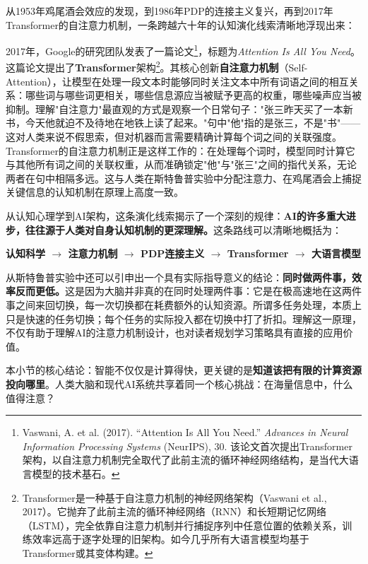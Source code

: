 从1953年鸡尾酒会效应的发现，到1986年PDP的连接主义复兴，再到2017年Transformer的自注意力机制，一条跨越六十年的认知演化线索清晰地浮现出来：

2017年，Google的研究团队发表了一篇论文\footnote{Vaswani, A. et al. (2017). ``Attention Is All You Need.'' \emph{Advances in Neural Information Processing Systems} (NeurIPS), 30. 该论文首次提出Transformer架构，以自注意力机制完全取代了此前主流的循环神经网络结构，是当代大语言模型的技术基石。}，标题为\emph{Attention Is All You Need}。这篇论文提出了\textbf{Transformer}架构\footnote{Transformer是一种基于自注意力机制的神经网络架构（Vaswani et al., 2017）。它抛弃了此前主流的循环神经网络（RNN）和长短期记忆网络（LSTM），完全依靠自注意力机制并行捕捉序列中任意位置的依赖关系，训练效率远高于逐字处理的旧架构。如今几乎所有大语言模型均基于Transformer或其变体构建。}。其核心创新\textbf{自注意力机制}（Self-Attention），让模型在处理一段文本时能够同时关注文本中所有词语之间的相互关系：哪些词与哪些词更相关，哪些信息源应当被赋予更高的权重，哪些噪声应当被抑制。理解"自注意力"最直观的方式是观察一个日常句子："张三昨天买了一本新书，今天他就迫不及待地在地铁上读了起来。"句中"他"指的是张三，不是"书"——这对人类来说不假思索，但对机器而言需要精确计算每个词之间的关联强度。Transformer的自注意力机制正是这样工作的：在处理每个词时，模型同时计算它与其他所有词之间的关联权重，从而准确锁定"他"与"张三"之间的指代关系，无论两者在句中相隔多远。这与人类在斯特鲁普实验中分配注意力、在鸡尾酒会上捕捉关键信息的认知机制在原理上高度一致。

从认知心理学到AI架构，这条演化线索揭示了一个深刻的规律：\textbf{AI的许多重大进步，往往源于人类对自身认知机制的更深理解。}这条路线可以清晰地概括为：

\begin{center}
\textbf{认知科学 $\rightarrow$ 注意力机制 $\rightarrow$ PDP连接主义 $\rightarrow$ Transformer $\rightarrow$ 大语言模型}
\end{center}

从斯特鲁普实验中还可以引申出一个具有实际指导意义的结论：\textbf{同时做两件事，效率反而更低。}这是因为大脑并非真的在同时处理两件事：它是在极高速地在这两件事之间来回切换，每一次切换都在耗费额外的认知资源。所谓多任务处理，本质上只是快速的任务切换；每个任务的实际投入都在切换中打了折扣。理解这一原理，不仅有助于理解AI的注意力机制设计，也对读者规划学习策略具有直接的应用价值。

本小节的核心结论：智能不仅仅是计算得快，更关键的是\textbf{知道该把有限的计算资源投向哪里}。人类大脑和现代AI系统共享着同一个核心挑战：在海量信息中，什么值得注意？

